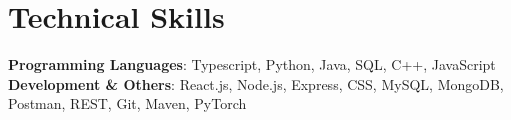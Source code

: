 \vspace{-8pt}
\section{\bfseries Technical Skills}
\vspace{1pt}
 \begin{itemize}[leftmargin=0.05in, label={}]
    \small{\item{
     \textbf{Programming Languages}{: Typescript, Python, Java, SQL, C++, JavaScript} 
     \newline
     \textbf{Development \& Others}{: React.js, Node.js,  Express, CSS, MySQL, MongoDB, Postman, REST, Git, Maven, PyTorch}
    }}
 \end{itemize}